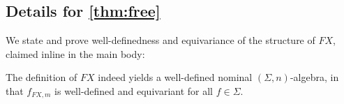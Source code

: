 \documentclass[a4paper,UKenglish,cleveref,thm-restate,numberwithinsect,final]{lipics-v2021}
\newcommand{\sig}{\Sigma}
\newcommand{\sigp}{\Sigma_0}
\newcommand{\sigf}{\Sigma_{\mathsf f}}
\newcommand{\sigb}{\Sigma_{\mathsf b}}
\theoremstyle{plain}
\numberwithin{equation}{section}
\newcommand{\+}[1]{\mathcal{#1}\xspace}
\theoremstyle{definition}
\begin{document}
\subsection*{Details for \cref{thm:free}}
We state and prove well-definedness and equivariance of the structure of $FX$, claimed inline in the main body:
\begin{lemma}\label{thm:freemodelisalgebra}
  The definition of \(FX\) indeed yields a well-defined nominal
  \((\sig, n)\)-algebra, in that \(f_{FX, m}\) is well-defined and equivariant for all \(f \in \sig\).
\end{lemma}
\end{document}
